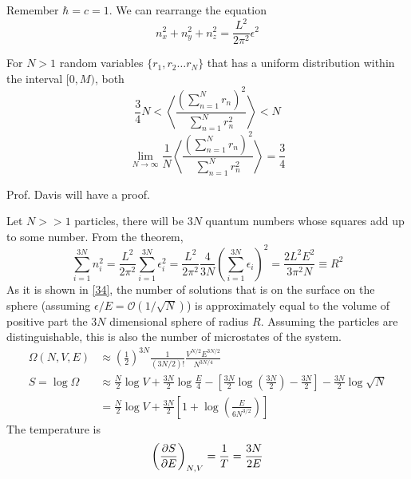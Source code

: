 \documentclass{article}
\begin{document}
\begin{sol}[1.7]
    Remember $\hbar=c=1$. We can rearrange the equation
    \begin{equation}
        n_x^2+n_y^2+n_z^2=\frac{L^2}{2\pi^2}\epsilon^2
    \end{equation}
    \begin{lemma}
        For $N>1$ random variables $\{r_1,r_2\dots r_N\}$ that has a uniform distribution within the interval $[0,M)$, both
        \begin{equation}
            \frac{3}{4}N<\left\langle\frac{(\sum_{n=1}^Nr_n)^2}{\sum_{n=1}^Nr_n^2}\right\rangle<N
        \end{equation}
        \begin{equation}
            \lim_{N\to\infty}\frac{1}{N}\left\langle\frac{(\sum_{n=1}^Nr_n)^2}{\sum_{n=1}^Nr_n^2}\right\rangle=\frac{3}{4}
        \end{equation}
    \end{lemma}
    \begin{prooof}
        Prof. Davis will have a proof.
    \end{prooof}
    Let $N>>1$ particles, there will be $3N$ quantum numbers whose squares add up to some number. From the theorem, 
    \begin{equation}
        \sum_{i=1}^{3N}n_i^2=\frac{L^2}{2\pi^2}\sum_{i=1}^{3N}\epsilon_i^2=\frac{L^2}{2\pi^2}\frac{4}{3N}\left(\sum_{i=1}^{3N}\epsilon_i\right)^2=\frac{2L^2E^2}{3\pi^2N}\equiv R^2
    \end{equation}
    As it is shown in \eqref{34}, the number of solutions that is on the surface on the sphere (assuming $\epsilon/E=\mathcal{O}(1/\sqrt{N})$) is approximately equal to the volume of positive part the $3N$ dimensional sphere of radius $R$. Assuming the particles are distinguishable, this is also the number of microstates of the system.
    \begin{align}
        \Omega(N,V,E)&\approx \left(\frac{1}{2}\right)^{3N}\frac{1}{(3N/2)!}\frac{V^{N/2}E^{3N/2}}{N^{3N/4}}\\
        S=\log \Omega&\approx \frac{N}{2}\log V+\frac{3N}{2}\log\frac{E}{4}-\left[\frac{3N}{2}\log\left(\frac{3N}{2}\right)-\frac{3N}{2}\right]-\frac{3N}{2}\log \sqrt N\\
        &=\frac{N}{2}\log V+\frac{3N}{2}\left[1+\log\left(\frac{E}{6N^{3/2}}\right)\right]
    \end{align}
    The temperature is
    \begin{equation}
        \left(\partialderivative{S}{E}\right)_{N,V}=\frac{1}{T}=\frac{3N}{2E}

\end{equation}
\end{sol}
\end{document}
